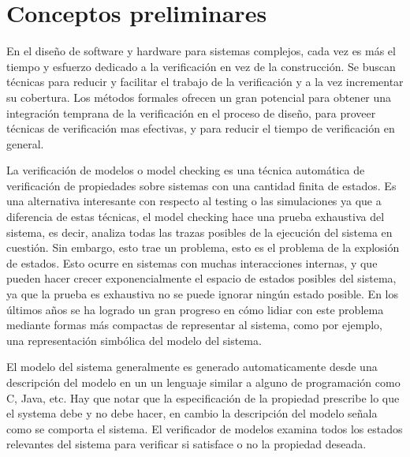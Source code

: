 \chapter{Conceptos preliminares}

En el diseño de software y hardware para sistemas complejos, cada vez es más el tiempo y esfuerzo dedicado a la verificación en vez de la construcción. Se buscan técnicas para reducir y facilitar el trabajo de la verificación y a la vez incrementar su cobertura. Los métodos formales ofrecen un gran potencial para obtener una integración temprana de la verificación en el proceso de diseño, para proveer técnicas de verificación mas efectivas, y para reducir el tiempo de verificación en general.

La verificación de modelos o model checking es una técnica automática de verificación de propiedades sobre sistemas con una cantidad finita de estados. Es una alternativa interesante con respecto al testing o las simulaciones ya que a diferencia de estas técnicas, el model checking hace una prueba exhaustiva del sistema, es decir, analiza todas las trazas posibles de la ejecución del sistema en cuestión. Sin embargo, esto trae un problema, esto es el problema de la explosión de estados. Esto ocurre en sistemas con muchas interacciones internas, y que pueden hacer crecer exponencialmente el espacio de estados posibles del sistema, ya que la prueba es exhaustiva no se puede ignorar ningún estado posible. En los últimos años se ha logrado un gran progreso en cómo lidiar con este problema mediante formas más compactas de representar al sistema, como por ejemplo, una representación simbólica del modelo del sistema.

El modelo del sistema generalmente es generado automaticamente desde una descripción del modelo en un un lenguaje similar a alguno de programación como C, Java, etc. Hay que notar que la especificación de la propiedad prescribe lo que el systema debe y no debe hacer, en cambio la descripción del modelo señala como se comporta el sistema. El verificador de modelos examina todos los estados relevantes del sistema para verificar si satisface o no la propiedad deseada.

